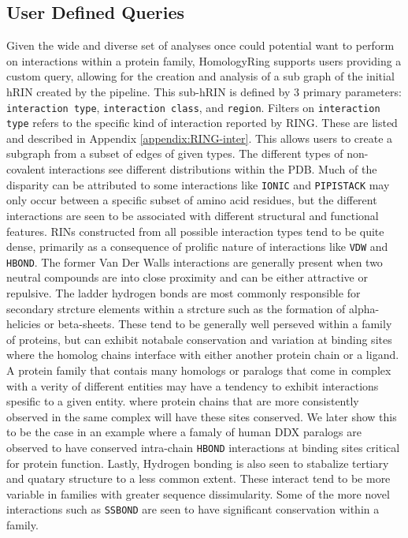 \subsection{User Defined Queries}
\label{sec:queries}
Given the wide and diverse set of analyses once could potential want to perform on interactions within a protein family, HomologyRing supports users providing a custom query, allowing for the creation and analysis of a sub graph of the initial hRIN created by the pipeline. This sub-hRIN is defined by 3 primary parameters: \texttt{interaction type}, \texttt{interaction class}, and \texttt{region}. 
Filters on \texttt{interaction type} refers to the specific kind of interaction reported by RING. These are listed and described in Appendix \ref{appendix:RING-inter}. This allows users to create a subgraph from a subset of edges of given types.
The different types of non-covalent interactions see different distributions within the PDB. 
Much of the disparity can be attributed to some interactions like \texttt{IONIC} and \texttt{PIPISTACK} may only occur between a specific subset of amino acid residues, but the different interactions are seen to be associated with different structural and functional features. 
RINs constructed from all possible interaction types tend to be quite dense, primarily as a consequence of prolific nature of interactions like \texttt{VDW} and \texttt{HBOND}. The former Van Der Walls interactions are generally present when two neutral compounds are into close proximity and can be either attractive or repulsive. The ladder hydrogen bonds are most commonly responsible for secondary strcture elements within a strcture such as the formation of alpha-helicies or beta-sheets. 
These tend to be generally well perseved within a family of proteins, but can exhibit notabale conservation and variation at binding sites where the homolog chains interface with either another protein chain or a ligand. A protein family that contais many homologs or paralogs that come in complex with a verity of different entities may have a tendency to exhibit interactions spesific to a given entity. where protein chains that are more consistently observed in the same complex will have these sites conserved. %
We later show this to be the case in an example where a famaly of human DDX paralogs are observed to have conserved intra-chain \texttt{HBOND} interactions at binding sites critical for protein function.
Lastly, Hydrogen bonding is also seen to stabalize tertiary and quatary structure to a less common extent. These interact tend to be more variable in families with greater sequence dissimularity. %
Some of the more novel interactions such as \texttt{SSBOND} are seen to have significant conservation within a family. 

